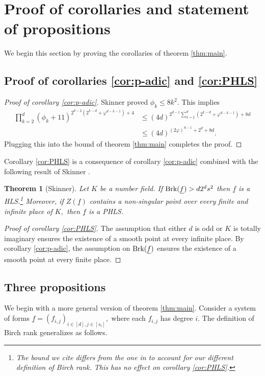 \documentclass[12pt]{amsart}
\let\ul\underline
\newtheorem{theorem}{Theorem}[section]
\theoremstyle{definition}
\newcommand{\brk}{\textnormal{Brk}}
\let\ul\underline
\begin{document}
\section{Proof of corollaries and statement of propositions}

We begin this section by proving the corollaries of theorem \ref{thm:main}.

\subsection{Proof of corollaries \ref{cor:p-adic} and \ref{cor:PHLS}}

\begin{proof}[Proof of corollary \ref{cor:p-adic}]
    Skinner proved \cite{Skinner-phi}  $\phi_k \le 8k^2.$ This implies 
    \begin{align*}
         \prod_{k=2}^d (\phi_k+11)^{2^{d-2}(2^{k-d}+\varphi^{d-k-1})+4} &\le           (4d)^{2^{d-1} \sum_{k=2}^d (2^{k-d}+\varphi^{d-k-1}) +8d} \\
         &\le (4d)^{(2\varphi)^{d-1} + 2^d +8d}. 
    \end{align*}
    Plugging this into the bound of theorem \ref{thm:main} completes the proof.
\end{proof}

Corollary \ref{cor:PHLS} is a consequence of corollary \ref{cor:p-adic} combined with the following result of Skinner \cite{Skinner-HLS}.  

\begin{theorem}[Skinner]\label{thm:HLS}
    Let $K$ be a number field. If  $\brk(\ul{f}) > d2^d s^2$ then $\ul{f}$ is a HLS.\footnote{The bound we cite differs from the one in \cite{Skinner-HLS} to account for our different definition of Birch rank. This has no effect on corollary \ref{cor:PHLS}.} Moreover, if $Z(\ul{f})$ contains a non-singular point over every finite and infinite place of $K,$ then $\ul{f}$ is a PHLS.  
\end{theorem}

\begin{proof}[Proof of corollary \ref{cor:PHLS}]
    The assumption that either $d$ is odd or $K$ is totally imaginary ensures the existence of a smooth point at every infinite place. By corollary \ref{cor:p-adic}, the assumption on $\brk(\ul{f})$ ensures the existence of a smooth point at every finite place.  
\end{proof}

\subsection{Three propositions}
We begin with a more general version of theorem \ref{thm:main}. Consider a system of forms $\ul{f} = (f_{i,j})_{i\in [d],j\in [s_i]},$ where each $f_{i,j}$ has degree $i.$ The definition of Birch rank generalizes as follows.
\end{document}
